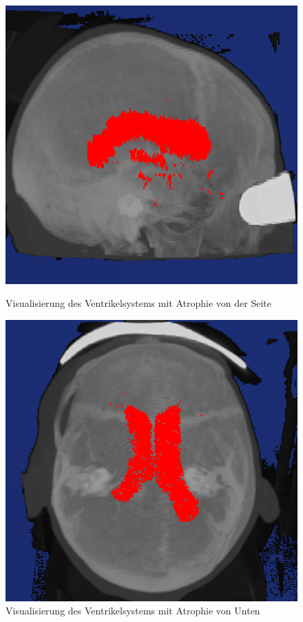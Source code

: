 \begin{figure}[H]
\begin{minipage}[b]{.5\textwidth}
  \centering
  \includegraphics[width=.98\linewidth, height=.98\linewidth]{Logos/Atrophie/Seite2.PNG}
  \caption{Visualisierung des Ventrikelsystems mit Atrophie von der Seite}
  \label{fig:atro_s}
\end{minipage}%
\begin{minipage}[b]{.5\textwidth}
  \centering
  \includegraphics[width=.98\linewidth, height=.98\linewidth]{Logos/Atrophie/Unten3.PNG}
  \caption{Visualisierung des Ventrikelsystems mit Atrophie von Unten}
  \label{fig:atro_u}
\end{minipage}
\end{figure}



